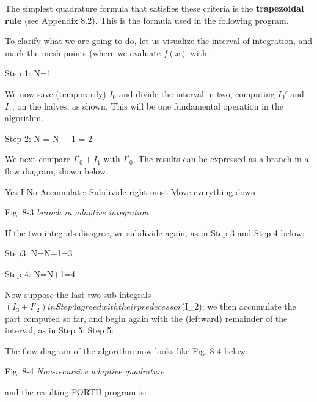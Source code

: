 The simplest quadrature formula that satisfies these criteria is the \textbf{trapezoidal rule} (see Appendix 8.2). This is the formula used in the following program.

To clarify what we are going to do, let us visualize the interval of integration, and mark the mesh points (where we evaluate $f(x)$ with \bc{+}:

Step 1: N=1

We now save (temporarily) $I_0$ and divide the interval in two, computing $I_{0}'$ and $I_1$, on the halves, as shown. This will be one fundamental operation in the algorithm.

Step 2: N = N + 1 = 2

We next compare $I'_0 + I_1$ with $I'_0$, The results can be expressed as a branch in a flow diagram, shown below.

Yes I No
Accumulate: Subdivide right-most
Move everything down

Fig. 8-3  \textit{branch in adaptive integration}

If the two integrals disagree, we subdivide again, as in Step 3 and
Step 4 below:

Step3: N=N+1=3

Step 4: N=N+1=4

Now suppose the last two sub-integrals $(I_3 + I'_2) in Step 4 agreed with their predecessor $(I_2); we then accumulate the part computed so far, and begin again with the (leftward) remainder of the interval, as in Step 5:
Step 5:

The flow diagram of the algorithm now looks like Fig. 8-4 below:

Fig. 8-4 \textit{Non-recursive adaptive quadrature}

and the resulting FORTH program is:

